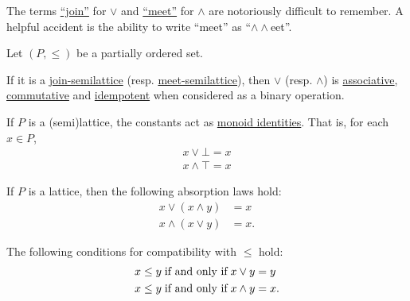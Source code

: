\begin{remark}\label{rem:lattice_operation_etymology}
  The terms \hyperref[def:semilattice/join]{\enquote{join}} for \( \vee \) and \hyperref[def:semilattice/meet]{\enquote{meet}} for \( \wedge \) are notoriously difficult to remember. A helpful accident is the ability to write \enquote{meet} as \enquote{\( \wedge \wedge \)eet}.
\end{remark}

\begin{proposition}\label{thm:binary_lattice_operations}
  Let \( (P, \leq) \) be a partially ordered set.

  \begin{thmenum}
     If it is a \hyperref[def:semilattice/join]{join-semilattice} (resp. \hyperref[def:semilattice/meet]{meet-semilattice}), then \( \vee \) (resp. \( \wedge \)) is \hyperref[def:magma/associative]{associative}, \hyperref[def:magma/commutative]{commutative} and \hyperref[def:magma/idempotent]{idempotent} when considered as a binary operation.

     If \( P \) is a (semi)lattice, the constants act as \hyperref[def:monoid]{monoid identities}. That is, for each \( x \in P \),
    \begin{align}
      x \vee \bot = x \label{eq:thm:binary_lattice_operations/identity/join} \\
      x \wedge \top = x \label{eq:thm:binary_lattice_operations/identity/meet}
    \end{align}

     If \( P \) is a lattice, then the following absorption laws hold:
    \begin{align}
      x \vee (x \wedge y) &= x \label{eq:thm:binary_lattice_operations/absorption/join} \\
      x \wedge (x \vee y) &= x \label{eq:thm:binary_lattice_operations/absorption/meet}.
    \end{align}

     The following conditions for compatibility with \( \leq \) hold:
    \begin{align}
      x \leq y &\T{if and only if} x \vee y = y \label{eq:thm:binary_lattice_operations/compatibility/join} \\
      x \leq y &\T{if and only if} x \wedge y = x \label{eq:thm:binary_lattice_operations/compatibility/meet}.
    \end{align}


\end{thmenum}
\end{proposition}
